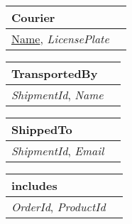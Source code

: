 \begin{tabularx}{\textwidth}{YY}
    \toprule
    \textbf{Courier} \\
    \midrule
    \underline{Name}, \textit{LicensePlate}  \\
    \bottomrule
\end{tabularx}

\begin{tabularx}{\textwidth}{YY}
    \toprule
    \textbf{TransportedBy} \\
    \midrule
    \textit{ShipmentId}, \textit{Name} \\
    \bottomrule
\end{tabularx}

\begin{tabularx}{\textwidth}{YY}
    \toprule
    \textbf{ShippedTo} \\
    \midrule
    \textit{ShipmentId}, \textit{Email} \\
    \bottomrule
\end{tabularx}

\begin{tabularx}{\textwidth}{YY}
    \toprule
    \textbf{includes} \\
    \midrule
    \textit{OrderId}, \textit{ProductId} \\
    \bottomrule
\end{tabularx}

\newpage